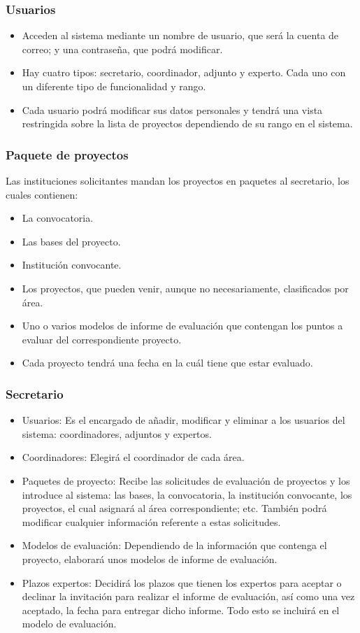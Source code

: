 \documentclass[12pt,a4paper,spanish,twoside]{article}
\begin{document}
\subsubsection{Usuarios}
\begin{itemize}
\item Acceden al sistema mediante un nombre de usuario, que será la cuenta de
  correo; y una contraseña, que podrá modificar.
\item Hay cuatro tipos: secretario, coordinador, adjunto y experto. Cada uno
  con un diferente tipo de funcionalidad y rango. 
\item Cada usuario podrá modificar sus datos personales y tendrá una vista
  restringida sobre la lista de proyectos dependiendo de su rango en el sistema.
\end{itemize}

\subsubsection{Paquete de proyectos}
Las instituciones solicitantes mandan los proyectos en paquetes al
secretario, los cuales contienen: 
\begin{itemize}
\item La convocatoria.
\item Las bases del proyecto.
\item Institución convocante.
\item Los proyectos, que pueden venir, aunque no necesariamente, clasificados
  por área. 
\item Uno o varios modelos de informe de evaluación que contengan los puntos
  a evaluar del correspondiente proyecto. 
\item Cada proyecto tendrá una fecha en la cuál tiene que estar evaluado.
\end{itemize}

\subsubsection{Secretario}
\begin{itemize}
\item Usuarios: Es el encargado de añadir, modificar y eliminar a los
  usuarios del sistema: coordinadores, adjuntos y expertos.
\item Coordinadores: Elegirá el coordinador de cada área.
\item Paquetes de proyecto: Recibe las solicitudes de evaluación de proyectos
  y los introduce al sistema: las bases, la convocatoria, la institución
  convocante, los proyectos, el cual asignará al área correspondiente;
  etc. También podrá modificar cualquier información referente a estas
  solicitudes. 
\item Modelos de evaluación: Dependiendo de la información que contenga el
  proyecto, elaborará unos modelos de informe de evaluación. 
\item Plazos expertos: Decidirá los plazos que tienen los expertos para
  aceptar o declinar la invitación para realizar el informe de evaluación,
  así como una vez aceptado, la fecha para entregar dicho informe. Todo esto
  se incluirá en el modelo de evaluación.
\end{itemize}
\end{document}
